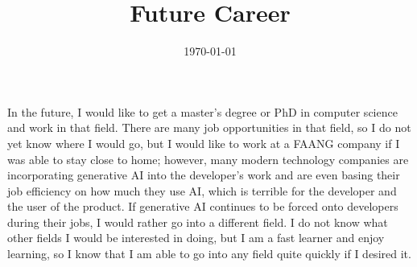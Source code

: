 \documentclass[12pt, letterpaper]{article}
\title{Future Career}
\date{\today}
\begin{document}
\maketitle

In the future, I would like to get a master's degree or PhD in computer science and work in that field. There are many job opportunities in that field, so I do not yet know where I would go, but I would like to work at a FAANG company if I was able to stay close to home; however, many modern technology companies are incorporating generative AI into the developer's work and are even basing their job efficiency on how much they use AI, which is terrible for the developer and the user of the product. If generative AI continues to be forced onto developers during their jobs, I would rather go into a different field. I do not know what other fields I would be interested in doing, but I am a fast learner and enjoy learning, so I know that I am able to go into any field quite quickly if I desired it.
\end{document}
